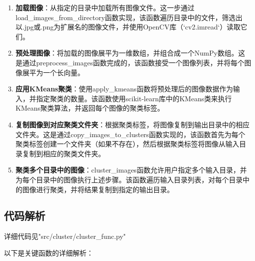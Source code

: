 \begin{enumerate}[label=\arabic*.]
	\item \textbf{加载图像}：从指定的目录中加载所有图像文件。这一步通过
	load\_images\_from\_directory函数实现，该函数遍历目录中的文件，筛选出以.jpg或.png为扩展名的图像文件，并使用OpenCV库（`cv2.imread`）读取它们。

	\item \textbf{预处理图像}：将加载的图像展平为一维数组，并组合成一个NumPy数组。这是通过preprocess\_images函数完成的，该函数接受一个图像列表，并将每个图像展平为一个长向量。

	\item \textbf{应用KMeans聚类}：使用apply\_kmeans函数将预处理后的图像数据作为输入，并指定聚类的数量。该函数使用scikit-learn库中的KMeans类来执行KMeans聚类算法，并返回每个图像的聚类标签。

	\item \textbf{复制图像到对应聚类文件夹}：根据聚类标签，将图像复制到输出目录中的相应文件夹。这是通过copy\_images\_to\_clusters函数实现的，该函数首先为每个聚类标签创建一个文件夹（如果不存在），然后根据聚类标签将图像从输入目录复制到相应的聚类文件夹。

	\item \textbf{聚类多个目录中的图像}：cluster\_images函数允许用户指定多个输入目录，并为每个目录中的图像执行上述步骤。该函数遍历输入目录列表，对每个目录中的图像进行聚类，并将结果复制到指定的输出目录。
\end{enumerate}

\subsection{代码解析}

详细代码见"src/cluster/cluster\_func.py"

以下是关键函数的详细解析：

